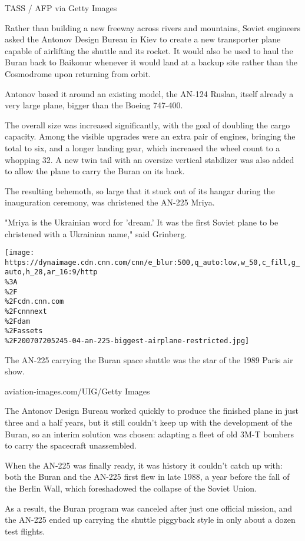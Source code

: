 TASS / AFP via Getty Images

Rather than building a new freeway across rivers and mountains, Soviet
engineers asked the Antonov Design Bureau in Kiev to create a new
transporter plane capable of airlifting the shuttle and its rocket. It
would also be used to haul the Buran back to Baikonur whenever it would
land at a backup site rather than the Cosmodrome upon returning from
orbit.

Antonov based it around an existing model, the AN-124 Ruslan, itself
already a very large plane, bigger than the Boeing 747-400.

The overall size was increased significantly, with the goal of doubling
the cargo capacity. Among the visible upgrades were an extra pair of
engines, bringing the total to six, and a longer landing gear, which
increased the wheel count to a whopping 32. A new twin tail with an
oversize vertical stabilizer was also added to allow the plane to carry
the Buran on its back.

The resulting behemoth, so large that it stuck out of its hangar during
the inauguration ceremony, was christened the AN-225 Mriya.

"Mriya is the Ukrainian word for 'dream.' It was the first Soviet plane
to be christened with a Ukrainian name," said Grinberg.

\texttt{[image: https://dynaimage.cdn.cnn.com/cnn/e\_blur:500,q\_auto:low,w\_50,c\_fill,g\_auto,h\_28,ar\_16:9/http\\\%3A\\\%2F\\\%2Fcdn.cnn.com\\\%2Fcnnnext\\\%2Fdam\\\%2Fassets\\\%2F200707205245-04-an-225-biggest-airplane-restricted.jpg]}

The AN-225 carrying the Buran space shuttle was the star of the 1989
Paris air show.

aviation-images.com/UIG/Getty Images

The Antonov Design Bureau worked quickly to produce the finished plane
in just three and a half years, but it still couldn't keep up with the
development of the Buran, so an interim solution was chosen: adapting a
fleet of old 3M-T bombers to carry the spacecraft unassembled.

When the AN-225 was finally ready, it was history it couldn't catch up
with: both the Buran and the AN-225 first flew in late 1988, a year
before the fall of the Berlin Wall, which foreshadowed the collapse of
the Soviet Union.

As a result, the Buran program was canceled after just one official
mission, and the AN-225 ended up carrying the shuttle piggyback style in
only about a dozen test flights.

